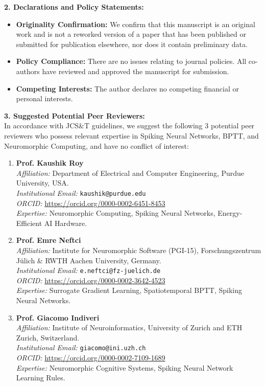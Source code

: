 \documentclass[11pt]{article}
\begin{document}
\noindent \textbf{2. Declarations and Policy Statements:}
\begin{itemize}
    \item \textbf{Originality Confirmation:} We confirm that this manuscript is an original work and is not a reworked version of a paper that has been published or submitted for publication elsewhere, nor does it contain preliminary data.
    \item \textbf{Policy Compliance:} There are no issues relating to journal policies. All co-authors have reviewed and approved the manuscript for submission.
    \item \textbf{Competing Interests:} The author declares no competing financial or personal interests.
\end{itemize}

\noindent \textbf{3. Suggested Potential Peer Reviewers:} \\
In accordance with JCS\&T guidelines, we suggest the following 3 potential peer reviewers who possess relevant expertise in Spiking Neural Networks, BPTT, and Neuromorphic Computing, and have no conflict of interest:

\begin{enumerate}
    \item \textbf{Prof. Kaushik Roy} \\
    \emph{Affiliation:} Department of Electrical and Computer Engineering, Purdue University, USA. \\
    \emph{Institutional Email:} \texttt{kaushik@purdue.edu} \\
    \emph{ORCID:} \url{https://orcid.org/0000-0002-6451-8453} \\
    \emph{Expertise:} Neuromorphic Computing, Spiking Neural Networks, Energy-Efficient AI Hardware.

    \item \textbf{Prof. Emre Neftci} \\
    \emph{Affiliation:} Institute for Neuromorphic Software (PGI-15), Forschungszentrum Jülich \& RWTH Aachen University, Germany. \\
    \emph{Institutional Email:} \texttt{e.neftci@fz-juelich.de} \\
    \emph{ORCID:} \url{https://orcid.org/0000-0002-3642-4523} \\
    \emph{Expertise:} Surrogate Gradient Learning, Spatiotemporal BPTT, Spiking Neural Networks.

    \item \textbf{Prof. Giacomo Indiveri} \\
    \emph{Affiliation:} Institute of Neuroinformatics, University of Zurich and ETH Zurich, Switzerland. \\
    \emph{Institutional Email:} \texttt{giacomo@ini.uzh.ch} \\
    \emph{ORCID:} \url{https://orcid.org/0000-0002-7109-1689} \\
    \emph{Expertise:} Neuromorphic Cognitive Systems, Spiking Neural Network Learning Rules.
\end{enumerate}
\end{document}
